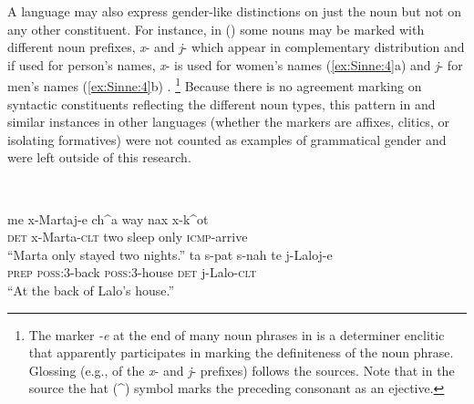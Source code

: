\documentclass[output=collectionpaper]{langsci/langscibook}
\begin{document}
A language may also express gender-like distinctions on just the noun but not on any other constituent. For instance, in  () some nouns may be marked with different noun prefixes, \textit{x}{}- and \textit{j}{}- which appear in complementary distribution and if used for person's names, \textit{x}{}- is used for women's names (\ref{ex:Sinne:4}a) and \textit{j}{}- for men's names (\ref{ex:Sinne:4}b) \citep[20]{Shklovsky2005}.%
\footnote{The marker \textit{{}-e} at the end of many noun phrases in  is a determiner enclitic \citep[127]{Shklovsky2012} that apparently participates in marking the definiteness of the noun phrase. Glossing (e.g., of the \textit{x}{}- and \textit{j}{}- prefixes) follows the sources. Note that in the source the hat (\^{}) symbol marks the preceding consonant as an ejective.} %
Because there is no agreement marking on syntactic constituents reflecting the different noun types, this pattern in  and similar instances in other languages (whether the markers are affixes, clitics, or isolating formatives) were not counted as examples of grammatical gender and were left outside of this research.

\ea
\label{ex:Sinne:4}
\\
\begin{xlist}
\ex
\gll me x-Martaj-e ch\^{}a way nax x-k\^{}ot\\
\textsc{det} x{}-Marta-\textsc{clt} two sleep only \textsc{icmp}{}-arrive\\
\glt ``Marta only stayed two nights.''
\ex
\gll ta s-pat s-nah te j-Laloj-e\\
\textsc{prep} \textsc{poss}:3-back \textsc{poss}:3-house \textsc{det} j{}-Lalo-\textsc{clt}\\
\glt ``At the back of Lalo's house.''\\
\end{xlist}
\z
\end{document}

